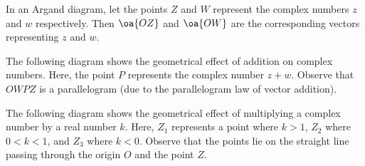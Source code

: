 In an Argand diagram, let the points $Z$ and $W$ represent the complex numbers $z$ and $w$ respectively. Then $\oa{OZ}$ and $\oa{OW}$ are the corresponding vectors representing $z$ and $w$.

The following diagram shows the geometrical effect of addition on complex numbers. Here, the point $P$ represents the complex number $z + w$. Observe that $OWPZ$ is a parallelogram (due to the parallelogram law of vector addition).

\begin{center}
\end{center}

The following diagram shows the geometrical effect of multiplying a complex number by a real number $k$. Here, $Z_1$ represents a point where $k > 1$, $Z_2$ where $0 < k < 1$, and $Z_3$ where $k < 0$. Observe that the points lie on the straight line passing through the origin $O$ and the point $Z$.


